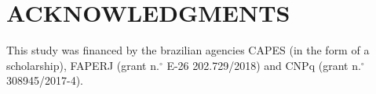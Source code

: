 \documentclass[manuscript,revised]{geophysics}
\begin{document}
%

\section{ACKNOWLEDGMENTS}

This study was financed by the brazilian agencies CAPES (in the form of a scholarship), FAPERJ (grant n.$^{\circ}$ E-26 202.729/2018) and CNPq (grant n.$^{\circ}$ 308945/2017-4).






%


%

\newpage


\end{document}
